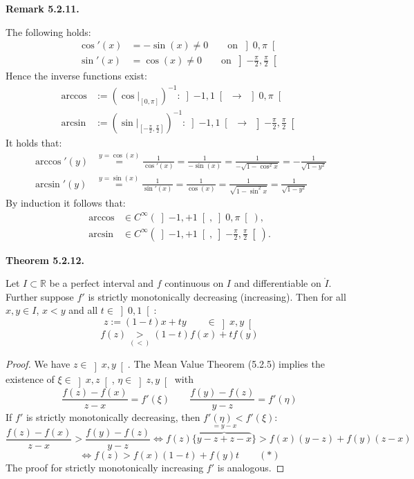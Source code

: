 \documentclass[12pt]{article}
\newenvironment{satz}[1]{%
  \par\vspace{6pt}\noindent\textbf{Theorem #1.}\itshape\space
}{%
  \par\vspace{6pt}
}
\newenvironment{bemerkung}[1]{%
  \par\vspace{6pt}\noindent\textbf{Remark #1.}\itshape\space
}{%
  \par\vspace{6pt}
}
\begin{document}
\begin{bemerkung}{5.2.11}
The following holds:
\begin{align*}
    \cos'(x) &= -\sin(x) \neq 0 \qquad \text{on } \left]0, \pi\right[ \\
    \sin'(x) &= \cos(x) \neq 0 \qquad \text{on } \left]-\tfrac{\pi}{2}, \tfrac{\pi}{2}\right[
\end{align*}
Hence the inverse functions exist:
\begin{align*}
    \arccos &:= \left(\cos\big|_{[0,\pi]}\right)^{-1} : \left]-1,1\right[ \;\to\; \left]0,\pi\right[ \\
    \arcsin &:= \left(\sin\big|_{[-\frac{\pi}{2},\frac{\pi}{2}]}\right)^{-1} : \left]-1,1\right[ \;\to\; \left]-\tfrac{\pi}{2},\tfrac{\pi}{2}\right[
\end{align*}
It holds that:
\begin{align*}
    \arccos'(y) &\overset{y=\cos(x)}{=} \frac{1}{\cos'(x)} = \frac{1}{-\sin(x)} = \frac{1}{-\sqrt{1-\cos^2 x}} = -\frac{1}{\sqrt{1-y^2}} \\
    \arcsin'(y) &\overset{y=\sin(x)}{=} \frac{1}{\sin'(x)} = \frac{1}{\cos(x)} = \frac{1}{\sqrt{1-\sin^2 x}} = \frac{1}{\sqrt{1-y^2}}
\end{align*}
By induction it follows that:
\begin{align*}
    \arccos &\in C^\infty(\left]-1,+1\right[, \left]0,\pi\right[), \\
    \arcsin &\in C^\infty\!\left(\left]-1,+1\right[, \left]-\tfrac{\pi}{2},\tfrac{\pi}{2}\right[\right).
\end{align*}
\end{bemerkung}

\begin{satz}{5.2.12}
Let $I \subset \mathbb{R}$ be a perfect interval and $f$ continuous on $I$ and differentiable on $\mathring{I}$. Further suppose $f'$ is strictly monotonically decreasing (increasing). Then for all $x, y \in I$, $x < y$ and all $t \in \left]0,1\right[$:
\[
    z := (1-t)x + ty \qquad \in \left]x,y\right[
\]
\[
    f(z) \underset{(<)}{>} (1-t)f(x) + tf(y)
\]
\end{satz}

\begin{proof}
We have $z \in \left]x,y\right[$. The Mean Value Theorem (5.2.5) implies the existence of $\xi \in \left]x,z\right[$, $\eta \in \left]z,y\right[$ with
\[
    \frac{f(z)-f(x)}{z-x} = f'(\xi) \qquad \frac{f(y)-f(z)}{y-z} = f'(\eta)
\]
If $f'$ is strictly monotonically decreasing, then $f'(\eta) < f'(\xi)$:
\[
    \frac{f(z)-f(x)}{z-x} > \frac{f(y)-f(z)}{y-z}
    \iff f(z)\{\overbrace{y-z+z-x}^{=y-x}\} > f(x)(y-z) + f(y)(z-x)
\]
\[
    \iff f(z) > f(x)(1-t) + f(y)t \qquad (*)
\]
The proof for strictly monotonically increasing $f'$ is analogous.
\end{proof}
\end{document}
